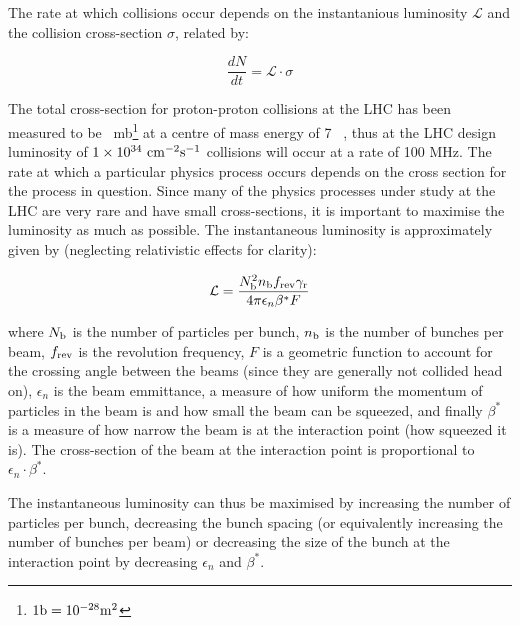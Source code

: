 The rate at which collisions occur depends on the instantanious luminosity
$\mathcal{L}$ and the collision cross-section $\sigma$, related by:

\begin{equation}
\frac{dN}{dt} = \mathcal{L} \cdot \sigma
\end{equation}

The total cross-section for
proton-proton collisions at the LHC has been measured to be
~mb\footnote{$1 \rm{b} = 10^{-28}
m^{2}$} at a centre of mass energy of 7 \tev~\cite{0295-5075-96-2-21002}, thus
at the LHC design luminosity of $1 \times 10^{34}~\rm{cm}^{-2}\rm{s}^{-1}$
collisions will occur at a rate of 100 MHz. The rate at which a particular
physics process occurs depends on the cross section for the process in question.
Since many of the physics processes under study at the LHC are very rare and
have small cross-sections, it is important to maximise the luminosity as much as
possible. The instantaneous luminosity is approximately given by (neglecting relativistic
effects for clarity):

\begin{equation}
\mathcal{L} = \frac{N_{\rm{b}}^{2}n_{\rm{b}}f_{\rm{rev}}\gamma_{\rm{r}}}{4\pi
\epsilon_{n}\beta^{*} F}
\end{equation}

where $N_{\rm{b}}$ is the number of particles per bunch, $n_{\rm{b}}$ is the
number of bunches per beam, $f_{\rm{rev}}$ is the revolution frequency, $F$ is a
geometric function to account for the crossing angle between the beams (since
they are generally not collided head on), $\epsilon_{n}$ is the beam emmittance,
a measure of how uniform the momentum of particles in the beam is and how small
the beam can be squeezed, and finally $\beta^{*}$ is a measure of how narrow the
beam is at the interaction point (how squeezed it is). The cross-section of the beam at
the interaction point is proportional to $\epsilon_{n} \cdot \beta^{*}$.

%

The instantaneous luminosity can thus be maximised by increasing the
number of particles per bunch, decreasing the bunch spacing (or equivalently
increasing the number of bunches per beam) or decreasing the size of the bunch
at the interaction point by decreasing $\epsilon_{n}$ and $\beta^{*}$.

